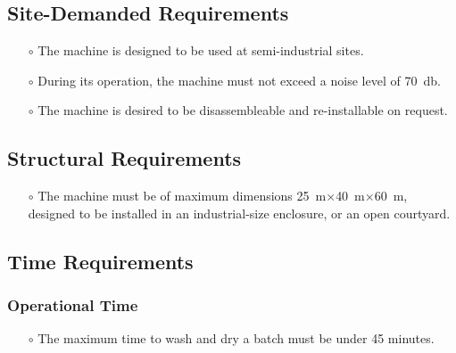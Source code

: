 \subsection{Site-Demanded Requirements}
\begin{itemize}
    \item[$\scriptstyle\circ$] The machine is designed to be used at \gls{semi-industrial sites}. 
    \item[$\scriptstyle\circ$] During its operation, the machine must not exceed a noise level of \SI{70}{\decibel}. 
    \item[$\scriptstyle\circ$] The machine is desired to be disassembleable and re-installable on request. 
\end{itemize}
\subsection{Structural Requirements}
\begin{itemize}
    \item[$\scriptstyle\circ$] The machine must be of maximum dimensions \SI{25}{\meter}$\times$\SI{40}{\meter}$\times$\SI{60}{\meter}, designed to be installed in an industrial-size enclosure, or an open courtyard. 
\end{itemize}
\subsection{Time Requirements}
\subsubsection{Operational Time}
    \begin{itemize}
        \item[$\scriptstyle\circ$] The maximum time to wash and dry a batch must be under 45 minutes. 
    \end{itemize}
